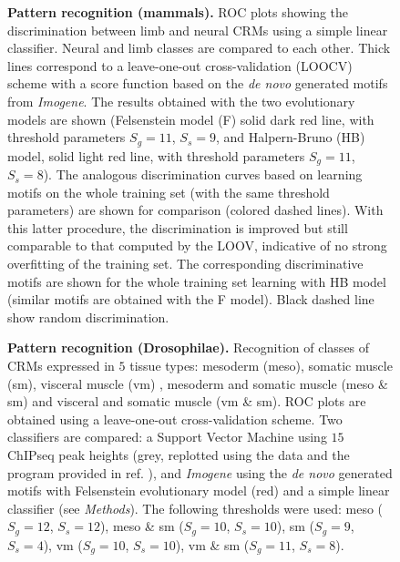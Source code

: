 \documentclass[a4,center,fleqn]{NAR}
\begin{document}
    \begin{figure}[!htbp]
\begin{center}    
\end{center}
\caption{
    {\bf Pattern recognition (mammals).} 
     ROC plots showing the discrimination between limb and neural CRMs using
     a simple linear classifier.
     Neural and limb classes are compared to each other. 
     Thick lines correspond to a leave-one-out cross-validation (LOOCV) scheme
     with a score function based on the {\it de novo} generated motifs from
     {\em Imogene}. 
     The results obtained with the two evolutionary models are shown
     (Felsenstein model (F) solid dark red line, with threshold parameters
     $S_g=11$, $S_s=9$, and Halpern-Bruno (HB) model, solid light red line,
     with threshold parameters $S_g=11$, $S_s=8$).
     The analogous discrimination curves based on learning motifs on  the whole
     training set (with the same threshold parameters) are shown for comparison
     (colored dashed lines). With this latter procedure, the discrimination is
     improved but still comparable to that computed by the LOOV, indicative of
     no strong overfitting of the training set. The corresponding
     discriminative motifs are shown for the whole training set learning with
     HB model (similar motifs are obtained with the F model).
     Black dashed line show random discrimination.  }   
    \label{fig:patternmam}
\end{figure}

    \begin{figure}[!htbp]
\begin{center}    
\end{center}
\caption{
    {\bf Pattern recognition (Drosophilae).}     
    Recognition of classes of CRMs expressed in $5$ tissue types: mesoderm
    (meso), somatic muscle (sm), visceral muscle (vm) , mesoderm and somatic
    muscle (meso \& sm) and visceral and somatic muscle (vm \& sm).
    ROC plots are obtained using a leave-one-out cross-validation scheme.
    Two classifiers are compared: a Support Vector Machine using $15$ ChIPseq
    peak heights (grey, replotted using the data and the program provided in
    ref. \cite{pmid19890324}), and {\em Imogene} using the {\it de novo}
    generated motifs with Felsenstein evolutionary model (red) and a simple
    linear classifier (see {\em Methods}).
    The following thresholds were used: meso ($S_g=12$, $S_s=12$), meso \& sm
($S_g=10$, $S_s=10$), sm ($S_g=9$, $S_s=4$), vm ($S_g=10$, $S_s=10$), vm \& sm
($S_g=11$, $S_s=8$).  }
    \label{fig:patterndro}
\end{figure}
\end{document}
